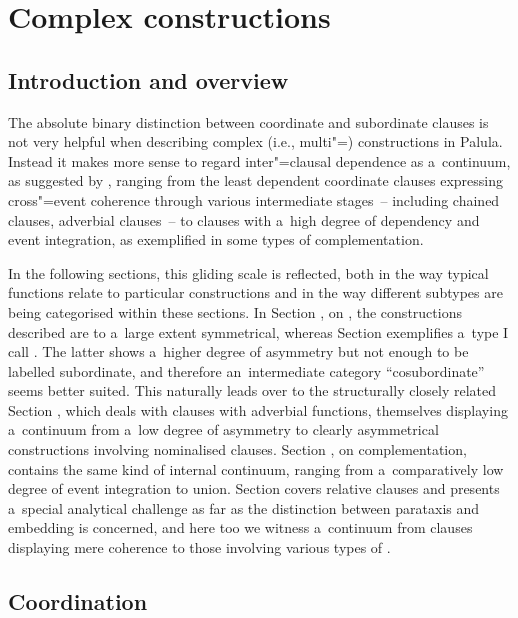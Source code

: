 \chapter{Complex constructions}
\label{chap:13}

\section{Introduction and overview}
\label{sec:13-1}


The absolute binary distinction between coordinate and subordinate clauses is not very helpful when describing complex (i.e., multi"=) constructions in Palula. Instead it makes more sense to regard inter"=clausal dependence as a~continuum, as suggested by \citet[327--328]{givon2001b}, ranging from the least dependent coordinate clauses expressing cross"=event coherence through various intermediate stages~-- including chained clauses, adverbial clauses~-- to clauses with a~high degree of dependency and event integration, as exemplified in some types of complementation.



In the following sections, this gliding scale is reflected, both in the way typical functions relate to particular constructions and in the way different subtypes are being categorised within these sections. In Section , on , the constructions described are to a~large extent symmetrical, whereas Section  exemplifies a~type I call . The latter shows a~higher degree of asymmetry but not enough to be labelled subordinate, and therefore an~intermediate category ``cosubordinate'' seems better suited. This naturally leads over to the structurally closely related Section , which deals with clauses with adverbial functions, themselves displaying a~continuum from a~low degree of asymmetry to clearly asymmetrical constructions involving nominalised clauses. Section , on complementation, contains the same kind of internal continuum, ranging from a~comparatively low degree of event integration to  union. Section  covers relative clauses and presents a~special analytical challenge as far as the distinction between parataxis and embedding is concerned, and here too we witness a~continuum from clauses displaying mere  coherence to those involving various types of .


\section{Coordination}
\label{sec:13-2}

